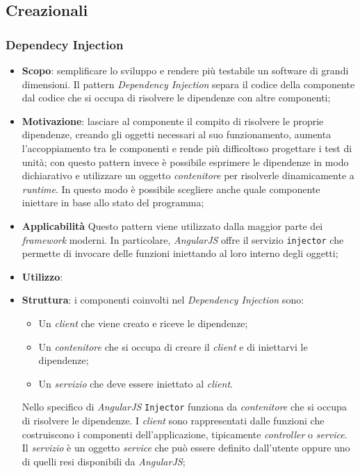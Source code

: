 \subsection{Creazionali}
\subsubsection{Dependecy Injection}
\begin{itemize}
\item \textbf{Scopo}: semplificare lo sviluppo e rendere più testabile un software di grandi dimensioni. Il pattern \textit{Dependency Injection} separa il codice della componente dal codice che si occupa di risolvere le dipendenze con altre componenti;
\item \textbf{Motivazione}: lasciare al componente il compito di risolvere le proprie dipendenze, creando gli oggetti necessari al suo funzionamento, aumenta l'accoppiamento tra le componenti e rende più difficoltoso progettare i test di unità; con questo pattern invece è possibile esprimere le dipendenze in modo dichiarativo e utilizzare un oggetto \textit{contenitore} per risolverle dinamicamente a \textit{runtime}. In questo modo è possibile scegliere anche quale componente iniettare in base allo stato del programma;
\item \textbf{Applicabilità}	Questo pattern viene utilizzato dalla maggior parte dei \textit{framework} moderni. In particolare, \textit{AngularJS} offre il servizio
\texttt{injector} che permette di invocare delle funzioni iniettando al loro interno degli oggetti;
\item \textbf{Utilizzo}:
\item \textbf{Struttura}: i componenti coinvolti nel \textit{Dependency Injection} sono:
	\begin{itemize}
		\item Un \textit{client} che viene creato e riceve le dipendenze;
		\item Un \textit{contenitore} che si occupa di creare il \textit{client} e di iniettarvi le dipendenze;
		\item Un \textit{servizio} che deve essere iniettato al \textit{client}.
	\end{itemize}
Nello specifico di \textit{AngularJS} \texttt{Injector} funziona da \textit{contenitore} che si occupa di risolvere le dipendenze. I \textit{client} sono rappresentati dalle funzioni che costruiscono i componenti dell'applicazione, tipicamente \textit{controller} o \textit{service}. Il \textit{servizio} è un oggetto \textit{service} che può essere definito dall'utente oppure uno di quelli resi disponibili da \textit{AngularJS};

\end{itemize}

